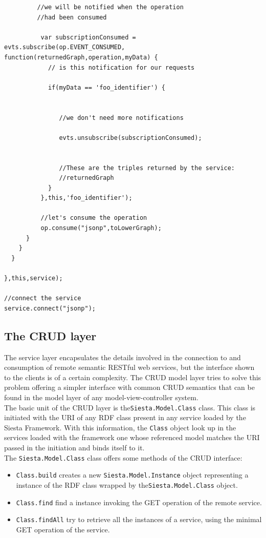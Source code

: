 \begin{lstlisting}
         //we will be notified when the operation 
         //had been consumed

          var subscriptionConsumed =  evts.subscribe(op.EVENT_CONSUMED, function(returnedGraph,operation,myData) {
            // is this notification for our requests

            if(myData == 'foo_identifier') {

  
               //we don't need more notifications

               evts.unsubscribe(subscriptionConsumed);


               //These are the triples returned by the service:
               //returnedGraph
            }
          },this,'foo_identifier');
          
          //let's consume the operation
          op.consume("jsonp",toLowerGraph);
      }
    }
  }

},this,service);

//connect the service
service.connect("jsonp");
\end{lstlisting} 
\vspace{5 mm}
\label{js_serv_1}

\subsection{The CRUD layer}

The service layer encapsulates the details involved in the connection to and consumption of remote semantic RESTful web
services, but the interface shown to the clients is of a certain complexity. The CRUD model layer tries to solve this
problem offering a simpler interface with common CRUD semantics that can be found in the model layer of any
model-view-controller system.\\

The basic unit of the CRUD layer is the\texttt{Siesta.Model.Class} class. This class is initiated with the URI of
any RDF class present in any service loaded by the Siesta Framework. With this information, the \texttt{Class}  object
look up in the services loaded with the framework one whose referenced model matches the URI passed in the initiation
and binds itself to it.\\

The \texttt{Siesta.Model.Class} class offers some methods of the CRUD interface: 
\begin{itemize}
\item \texttt{Class.build} creates a new \texttt{Siesta.Model.Instance} object representing a instance of the RDF class
  wrapped by the\texttt{Siesta.Model.Class} object. 
\item \texttt{Class.find} find a instance invoking the GET operation of the remote service.
\item \texttt{Class.findAll} try to retrieve all the instances of a service, using the minimal GET operation of the service.
\end{itemize}

